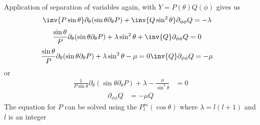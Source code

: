 %
Application of separation of variables again, with \(Y = P(\theta) Q(\phi)\) gives us
%
\begin{equation}\label{eqn:lecture5BigReviewAngularMomentum:5120}
\begin{aligned}
\inv{P \sin\theta} \partial_\theta (\sin\theta \partial_\theta P) + \inv{Q \sin^2\theta} \partial_{\phi\phi} Q &= -\lambda
\end{aligned}
\end{equation}
%
\begin{equation}\label{eqn:lecture5BigReviewAngularMomentum:5140}
\begin{aligned}
\frac{\sin\theta}{P } \partial_\theta (\sin\theta \partial_\theta P)
+\lambda  \sin^2\theta
+ \inv{Q } \partial_{\phi\phi} Q &= 0
\end{aligned}
\end{equation}
%
\begin{equation}\label{eqn:lecture5BigReviewAngularMomentum:5160}
\begin{aligned}
\frac{\sin\theta}{P } \partial_\theta (\sin\theta \partial_\theta P) + \lambda \sin^2\theta - \mu = 0
\inv{Q } \partial_{\phi\phi} Q &= -\mu
\end{aligned}
\end{equation}
%
or
\begin{equation}\label{eqn:PHY356F:1000}
\begin{aligned}
\frac{1}{P \sin\theta} \partial_\theta (\sin\theta \partial_\theta P) +\lambda -\frac{\mu}{\sin^2\theta} &= 0
\end{aligned}
\end{equation}
\begin{equation}\label{eqn:PHY356F:2000}
\begin{aligned}
\partial_{\phi\phi} Q &= -\mu Q
\end{aligned}
\end{equation}
%
The equation for \(P\) can be solved using the  \(P_l^m(\cos\theta)\) where \(\lambda = l(l+1)\) and \(l\) is an integer

